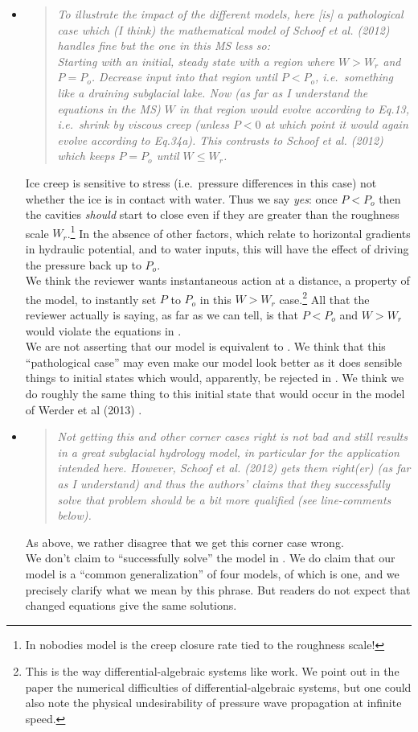 \documentclass[11pt,reqno]{amsart}
\newcommand{\reply}[2]{
\medskip\medskip
\item  \begin{quote}
\emph{#1}
\end{quote}

\medskip
\noindent #2}
\begin{document}
\begin{itemize}
\reply{To illustrate the impact of the different models, here [is] a pathological case which (I think) the mathematical model of Schoof et al. (2012) handles fine but the one in this MS less so: \\
\indent Starting with an initial, steady state with a region where $W > W_r$ and $P = P_o$.  Decrease input into that region until $P < P_o$, i.e.~something like a draining subglacial lake.  Now (as far as I understand the equations in the MS) $W$ in that region would evolve according to Eq.13, i.e.~shrink by viscous creep (unless $P < 0$ at which point it would again evolve according to Eq.34a). This contrasts to Schoof et al. (2012) which keeps $P = P_o$ until $W \le W_r$.}
{Ice creep is sensitive to stress (i.e.~pressure differences in this case) not whether the ice is in contact with water.  Thus we say \emph{yes}: once $P<P_o$ then the cavities \emph{should} start to close even if they are greater than the roughness scale $W_r$.\footnote{In nobodies model is the creep closure rate tied to the roughness scale!}  In the absence of other factors, which relate to horizontal gradients in hydraulic potential, and to water inputs, this will have the effect of driving the pressure back up to $P_o$.  \\
\indent  We think the reviewer wants instantaneous action at a distance, a property of the \cite{Schoofetal2012} model, to instantly set $P$ to $P_o$ in this $W>W_r$ case.\footnote{This is the way differential-algebraic systems like \cite{Schoofetal2012} work.  We point out in the paper the numerical difficulties of differential-algebraic systems, but one could also note the physical undesirability of pressure wave propagation at infinite speed.}   All that the reviewer actually is saying, as far as we can tell, is that $P<P_o$ and $W>W_r$ would violate the equations in \cite{Schoofetal2012}. \\
\indent We are not asserting that our model is equivalent to \cite{Schoofetal2012}.  We think that this ``pathological case'' may even make our model look better as it does sensible things to initial states which would, apparently, be rejected in \cite{Schoofetal2012}.  We think we do roughly the same thing to this initial state that would occur in the model of Werder et al (2013) \cite{Werderetal2013}.}

\reply{Not getting this and other corner cases right is not bad and still results in a great
subglacial hydrology model, in particular for the application intended here. However,
Schoof et al. (2012) gets them right(er) (as far as I understand) and thus the authors'
claims that they successfully solve that problem should be a bit more qualified (see
line-comments below).}
{As above, we rather disagree that we get this corner case wrong.\\
\indent We don't claim to ``successfully solve'' the model in \cite{Schoofetal2012}.  We do claim that our model is a ``common generalization'' of four models, of which \cite{Schoofetal2012} is one, and we precisely clarify what we mean by this phrase.  But readers do not expect that changed equations give the same solutions.}


\end{itemize}
\end{document}
